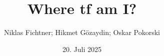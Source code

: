 \documentclass[oneside]{ausarbeitung}
\begin{document}


\Projektbericht

\Informatik

\title{Where tf am I?}

\author{Niklas Fichtner; Hikmet Gözaydin; Oskar Pokorski}

\examinerIsAProfessortrue   %


\date{20. Juli 2025}



\maketitle
\cleardoublepage

\setcounter{page}{1}


\makeconfidentialclause
\cleardoublepage


\cleardoublepage
\tableofcontents

\listoffigures

\listoftables
\end{document}
